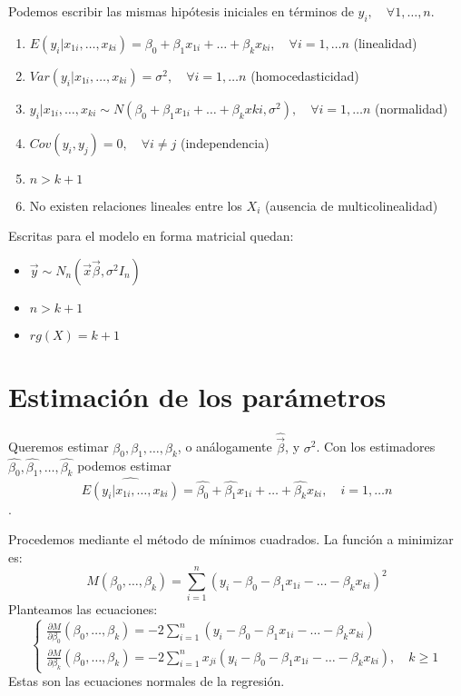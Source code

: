 \documentclass{report}
\theoremstyle{remark}
\theoremstyle{remark}
\theoremstyle{remark}
\theoremstyle{definition}
\theoremstyle{definition}
\theoremstyle{definition}
\begin{document}
Podemos escribir las mismas hipótesis iniciales en términos de $y_i, \quad \forall 1, \dots, n$.
\begin{enumerate}
    \item $E(y_i | x_{1i}, \dots, x_{ki}) = \beta_0 + \beta_1x_{1i} + \dots + \beta_kx_{ki}, \quad \forall i = 1, \dots n$ (linealidad)
    \item $Var(y_i | x_{1i}, \dots, x_{ki}) = \sigma^2, \quad \forall i = 1, \dots n$ (homocedasticidad)
    \item $y_i | x_{1i}, \dots, x_{ki} \sim N(\beta_0 + \beta_1x_{1i} + \dots + \beta_kx{ki}, \sigma^2), \quad \forall i = 1, \dots n$ (normalidad)
    \item $Cov(y_i, y_j) = 0, \quad \forall i \neq j$ (independencia)
    \item $n > k+1$
    \item No existen relaciones lineales entre los $X_i$ (ausencia de multicolinealidad)
\end{enumerate}
Escritas para el modelo en forma matricial quedan:
\begin{itemize}
    \item $\vec{y} \sim N_n(\vec{x}\vec{\beta}, \sigma^2 I_n)$
    \item $n > k+1$
    \item $rg(X) = k+1$
\end{itemize}

\section{Estimación de los parámetros}
Queremos estimar $\beta_0, \beta_1, \dots, \beta_k$, o análogamente $\hat{\vec{\beta}}$, y $\sigma^2$.
Con los estimadores $\hat{\beta_0}, \hat{\beta_1}, \dots, \hat{\beta_k}$ podemos estimar $$\hat{E(y_i | x_{1i}, \dots, x_{ki})} = \hat{\beta_0} + \hat{\beta_1}x_{1i} + \dots + \hat{\beta_k}x_{ki}, \quad i = 1, \dots n$$.

Procedemos mediante el método de mínimos cuadrados.
La función a minimizar es:
$$M(\beta_0, \dots, \beta_k) = \sum_{i=1}^n (y_i - \beta_0 - \beta_1x_{1i} - \dots - \beta_kx_{ki})^2$$
Planteamos las ecuaciones:
$$\begin{cases}
        \frac{\partial M}{\partial \beta_0} (\beta_0, \dots, \beta_k) = -2\sum_{i=1}^n (y_i - \beta_0 - \beta_1x_{1i} - \dots - \beta_kx_{ki}) \\
        \frac{\partial M}{\partial \beta_k} (\beta_0, \dots, \beta_k) = -2\sum_{i=1}^n x_{ji}(y_i - \beta_0 - \beta_1x_{1i} - \dots - \beta_kx_{ki}), \quad k \geq 1
    \end{cases}$$
Estas son las ecuaciones normales de la regresión.
\end{document}
